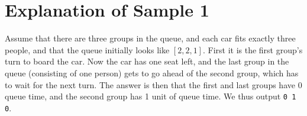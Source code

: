 \section*{Explanation of Sample 1}
Assume that there are three groups in the queue, and each car fits exactly three people, and that the queue
initially looks like $[2,2,1]$. First it is the first group's turn to board
the car. Now the car has one seat left, and the last group in the queue (consisting of one person) gets to go
ahead of the second group, which has to wait for the next turn. The answer is then that the first and last groups have 0 queue time, and the second group has 1 unit of queue time. We thus output \texttt{0 1 0}.
